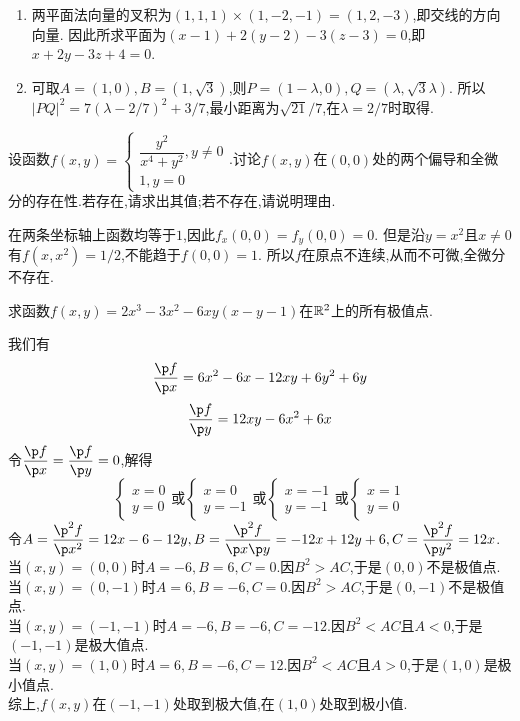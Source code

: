 \documentclass{ctexart}
\begin{document}
\begin{solution}
\begin{enumerate}[label=\tbf{(\arabic*)},leftmargin=*]
\item 两平面法向量的叉积为$(1,1,1)\times(1,-2,-1)=(1,2,-3)$,即交线的方向向量.
因此所求平面为$(x-1)+2(y-2)-3(z-3)=0$,即$x+2y-3z+4=0$.
\item 可取$A=(1,0),B=(1,\sqrt3)$,则$P=(1-\lambda,0),Q=(\lambda,\sqrt3\lambda)$.
所以$|PQ|^2=7(\lambda-2/7)^2+3/7$,最小距离为$\sqrt{21}/7$,在$\lambda=2/7$时取得.
\end{enumerate}
\end{solution}
\begin{problem}[4.(10\songti{分})]
设函数$\displaystyle f(x,y)=\left\{\begin{array}{l}
        \dfrac{y^2}{x^4+y^2},y\neq0\\
        1,y=0
    \end{array}\right.$.讨论$f(x,y)$在$(0,0)$处的两个偏导和全微分的存在性.若存在,请求出其值;若不存在,请说明理由.
\end{problem}
\begin{solution}
在两条坐标轴上函数均等于$1$,因此$f_x(0,0)=f_y(0,0)=0$.
但是沿$y=x^2$且$x\neq0$有$f(x,x^2)=1/2$,不能趋于$f(0,0)=1$.
所以$f$在原点不连续,从而不可微,全微分不存在.
\end{solution}
\begin{problem}[5.(12\songti{分})]
求函数$f(x,y)=2x^3-3x^2-6xy(x-y-1)$在$\mathbb{R}^2$上的所有极值点.
\end{problem}
\begin{solution}
我们有
    \[\dfrac{\p f}{\p x}=6x^2-6x-12xy+6y^2+6y\]
    \[\dfrac{\p f}{\p y}=12xy-6x^2+6x\]
    令$\dfrac{\p f}{\p x}=\dfrac{\p f}{\p y}=0$,解得
    \[\left\{\begin{array}{l}x=0\\y=0\end{array}\right.\text{或}
    \left\{\begin{array}{l}x=0\\y=-1\end{array}\right.\text{或}
    \left\{\begin{array}{l}x=-1\\y=-1\end{array}\right.\text{或}
    \left\{\begin{array}{l}x=1\\y=0\end{array}\right.\]
    令$A=\dfrac{\p^2f}{\p x^2}=12x-6-12y,B=\dfrac{\p^2 f}{\p x\p y}=-12x+12y+6,C=\dfrac{\p^2f}{\p y^2}=12x$.\\
    当$(x,y)=(0,0)$时$A=-6,B=6,C=0$.因$B^2>AC$,于是$(0,0)$不是极值点.\\
    当$(x,y)=(0,-1)$时$A=6,B=-6,C=0$.因$B^2>AC$,于是$(0,-1)$不是极值点.\\
    当$(x,y)=(-1,-1)$时$A=-6,B=-6,C=-12$.因$B^2<AC$且$A<0$,于是$(-1,-1)$是极大值点.\\
    当$(x,y)=(1,0)$时$A=6,B=-6,C=12$.因$B^2<AC$且$A>0$,于是$(1,0)$是极小值点.\\
    综上,$f(x,y)$在$(-1,-1)$处取到极大值,在$(1,0)$处取到极小值.
\end{solution}
\end{document}
